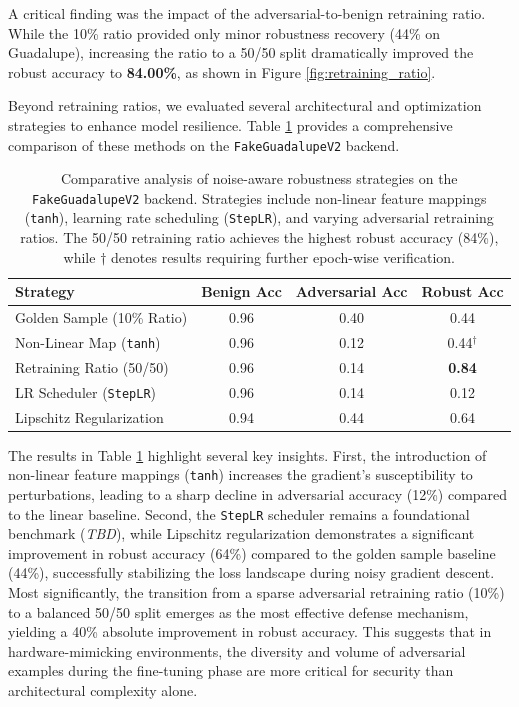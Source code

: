 A critical finding was the impact of the adversarial-to-benign retraining ratio. While the 10\% ratio provided only minor robustness recovery (44\% on Guadalupe), increasing the ratio to a 50/50 split dramatically improved the robust accuracy to \textbf{84.00\%}, as shown in Figure \ref{fig:retraining_ratio}.

Beyond retraining ratios, we evaluated several architectural and optimization strategies to enhance model resilience. Table \ref{tab:robustness_strategies} provides a comprehensive comparison of these methods on the \texttt{FakeGuadalupeV2} backend.

\begin{table}[h]
\centering
\begin{tabular}{lccc}
\toprule
\textbf{Strategy} & \textbf{Benign Acc} & \textbf{Adversarial Acc} & \textbf{Robust Acc} \\
\midrule
Golden Sample (10\% Ratio) & 0.96 & 0.40 & 0.44 \\
Non-Linear Map (\texttt{tanh}) & 0.96 & 0.12 & 0.44$^\dagger$ \\
Retraining Ratio (50/50) & 0.96 & 0.14 & \textbf{0.84} \\
LR Scheduler (\texttt{StepLR}) & 0.96 & 0.14 & 0.12 \\
Lipschitz Regularization & 0.94 & 0.44 & 0.64 \\
\bottomrule
\end{tabular}
    \caption{Comparative analysis of noise-aware robustness strategies on the \texttt{FakeGuadalupeV2} backend. Strategies include non-linear feature mappings (\texttt{tanh}), learning rate scheduling (\texttt{StepLR}), and varying adversarial retraining ratios. The 50/50 retraining ratio achieves the highest robust accuracy (84\%), while $\dagger$ denotes results requiring further epoch-wise verification.}
\label{tab:robustness_strategies}
\end{table}

The results in Table \ref{tab:robustness_strategies} highlight several key insights. First, the introduction of non-linear feature mappings (\texttt{tanh}) increases the gradient's susceptibility to perturbations, leading to a sharp decline in adversarial accuracy (12\%) compared to the linear baseline. Second, the \texttt{StepLR} scheduler remains a foundational benchmark (\textit{TBD}), while Lipschitz regularization demonstrates a significant improvement in robust accuracy (64\%) compared to the golden sample baseline (44\%), successfully stabilizing the loss landscape during noisy gradient descent. Most significantly, the transition from a sparse adversarial retraining ratio (10\%) to a balanced 50/50 split emerges as the most effective defense mechanism, yielding a 40\% absolute improvement in robust accuracy. This suggests that in hardware-mimicking environments, the diversity and volume of adversarial examples during the fine-tuning phase are more critical for security than architectural complexity alone.

